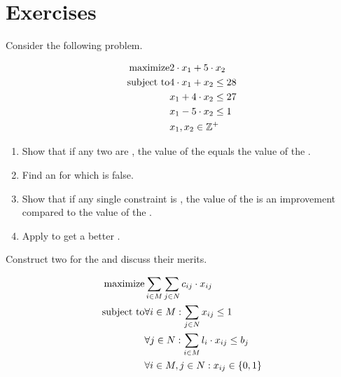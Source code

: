 \section*{Exercises}
\begin{exercise}
Consider the following problem.

\begin{eqnarray}
\mbox{maximize}&2\cdot x_1+5\cdot x_2\eqnlab{ex71-m}\\
\mbox{subject to}&4\cdot x_1+x_2\leq28\eqnlab{ex71-c1}\\
&x_1+4\cdot x_2\leq27\eqnlab{ex71-c2}\\
&x_1-5\cdot x_2\leq1\eqnlab{ex71-c3}\\
&x_1,x_2\in\ZZZ^+\eqnlab{ex71-c4}
\end{eqnarray}

\begin{enumerate}
 \item {} Show that if any two  are , the value of the  equals the value of the .
 \item Find an  for which  is false.
 \item Show that if any single constraint is , the value of the  is an improvement compared to the value of the .
 \item Apply  to get a better .
\end{enumerate}
\end{exercise}

\begin{exercise}
Construct two  for the  and discuss their merits.

\begin{eqnarray}
\mbox{maximize}&\sumdomain[i]{M}{\sumdomain[j]{N}{c_{ij}\cdot x_{ij}}}\eqnlab{ex72-m}\\
\mbox{subject to}&\forall i\in M:\sumdomain[j]{N}{x_{ij}}\leq 1\eqnlab{ex72-c1}\\
&\forall j\in N:\sumdomain[i]{M}{l_i\cdot x_{ij}}\leq b_j\eqnlab{ex72-c2}\\
&\forall i\in M,j\in N:x_{ij}\in\accl{0,1}\eqnlab{ex72-c3}
\end{eqnarray}
\end{exercise}